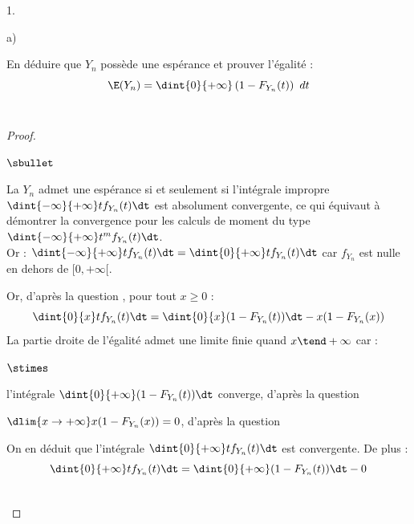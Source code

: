 \documentclass[11pt]{article}%
\begin{document}
\begin{noliste}{1.}
\begin{noliste}{a)}
  \item En déduire que $Y_{n}$ possède une espérance et prouver
    l'égalité :
    \[
    \E(Y_{n}) = \dint{0}{+ \infty} \left(1-F_{Y_{n}}(t)\right) \ dt
    \]~\\[-1.2cm]
    
    \begin{proof}~
      \begin{noliste}{$\sbullet$}
      \item La \var $Y_n$ admet une espérance si et seulement si
        l'intégrale impropre $\dint{-\infty}{+\infty} tf_{Y_n}(t)\dt$
        est absolument convergente, ce qui équivaut à démontrer la
        convergence pour les calculs de moment du type
        $\dint{-\infty}{+\infty} t^m f_{Y_n}(t)\dt$.\\
        Or : $\dint{-\infty}{+\infty} tf_{Y_n}(t)\dt =
        \dint{0}{+\infty} tf_{Y_n}(t)\dt$ car $f_{Y_n}$ est nulle en
        dehors de $[0, +\infty[$.
      \item Or, d'après la question , pour tout $x\geq 0$ :
      \[
      \dint{0}{x} tf_{Y_n}(t)\dt = \dint{0}{x}(1-F_{Y_n}(t)) \dt -
      x(1-F_{Y_n}(x)) %
      \]
      La partie droite de l'égalité admet une limite finie quand $x
      \tend +\infty$ car :
      \begin{noliste}{$\stimes$}
      \item l'intégrale $\dint{0}{+\infty} (1-F_{Y_n}(t))\dt$ 
	converge, d'après la question 
      \item $\dlim{x\to+\infty} x(1-F_{Y_n}(x))=0$, d'après la 
	question 
      \end{noliste}
      On en déduit que l'intégrale $\dint{0}{+\infty} tf_{Y_n}(t)\dt$ est
      convergente. De plus :
      \[
      \dint{0}{+\infty} tf_{Y_n}(t)\dt =
      \dint{0}{+\infty}(1-F_{Y_n}(t)) \dt - 0
      \]
      \end{noliste}
      ~\\[-1cm]
    \end{proof}
  \end{noliste}



\end{noliste}
\end{document}
